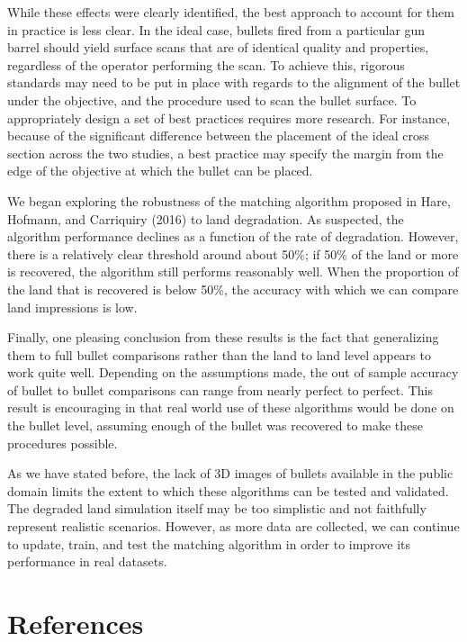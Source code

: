 \documentclass[12pt,]{article}
\theoremstyle{definition}
\theoremstyle{definition}
\theoremstyle{definition}
\theoremstyle{remark}
\begin{document}
While these effects were clearly identified, the best approach to
account for them in practice is less clear. In the ideal case, bullets
fired from a particular gun barrel should yield surface scans that are
of identical quality and properties, regardless of the operator
performing the scan. To achieve this, rigorous standards may need to be
put in place with regards to the alignment of the bullet under the
objective, and the procedure used to scan the bullet surface. To
appropriately design a set of best practices requires more research. For
instance, because of the significant difference between the placement of
the ideal cross section across the two studies, a best practice may
specify the margin from the edge of the objective at which the bullet
can be placed.

We began exploring the robustness of the matching algorithm proposed in
Hare, Hofmann, and Carriquiry (2016) to land degradation. As suspected,
the algorithm performance declines as a function of the rate of
degradation. However, there is a relatively clear threshold around about
50\%; if 50\% of the land or more is recovered, the algorithm still
performs reasonably well. When the proportion of the land that is
recovered is below 50\%, the accuracy with which we can compare land
impressions is low.

Finally, one pleasing conclusion from these results is the fact that
generalizing them to full bullet comparisons rather than the land to
land level appears to work quite well. Depending on the assumptions
made, the out of sample accuracy of bullet to bullet comparisons can
range from nearly perfect to perfect. This result is encouraging in that
real world use of these algorithms would be done on the bullet level,
assuming enough of the bullet was recovered to make these procedures
possible.

As we have stated before, the lack of 3D images of bullets available in
the public domain limits the extent to which these algorithms can be
tested and validated. The degraded land simulation itself may be too
simplistic and not faithfully represent realistic scenarios. However, as
more data are collected, we can continue to update, train, and test the
matching algorithm in order to improve its performance in real datasets.

\clearpage

\section*{References}\label{references}
\end{document}
